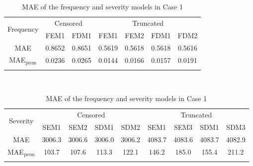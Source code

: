 \documentclass[11pt]{article}
\begin{document}
\begin{table}[!h]
\renewcommand{\tabcolsep}{0.8mm}
\renewcommand{\arraystretch}{1}
\footnotesize
\centering
{\color{blue}
\begin{tabular}[h]{ccccccc}
\toprule
\multirow{2}{*}{Frequency} & \multicolumn{2}{c}{Censored} & \multicolumn{4}{c}{Truncated}\\
\cmidrule(l{3pt}r{3pt}){2-3} \cmidrule(l{3pt}r{3pt}){4-7}
 & FEM1 & FDM1 & FEM1 & FEM2 & FDM1 & FDM2\\
\midrule
MAE & 0.8652 & 0.8651 & 0.5619 & 0.5618 & 0.5618 & 0.5616 \\
MAE$_{\text{prem}}$ & 0.0236 & 0.0265 & 0.0144 & 0.0166 & 0.0157 & 0.0191 \\
\hhline{=======}
\end{tabular}
\\
\vspace{0.3cm}
\begin{tabular}[h]{ccccccccc}
\toprule
\multirow{2}{*}{Severity} & \multicolumn{4}{c}{Censored} & \multicolumn{4}{c}{Truncated}\\
\cmidrule(l{3pt}r{3pt}){2-5} \cmidrule(l{3pt}r{3pt}){6-9}
 & SEM1 & SEM2 & SDM1 & SDM2 & SEM1 & SEM3 & SDM1 & SDM3\\
\midrule
MAE & 3006.3 & 3006.6 & 3006.0 & 3006.2 & 4083.7 & 4083.6 & 4083.7 & 4082.9 \\
MAE$_{\text{prem}}$ & 103.7 & 107.6 & 113.3 & 122.1 & 146.2 & 185.0 & 155.4 & 211.2 \\
\hhline{=========}
\end{tabular}
}
\caption{MAE of the frequency and severity models in Case 1}\label{tab:maecase1}
\end{table}


\FloatBarrier
\end{document}
